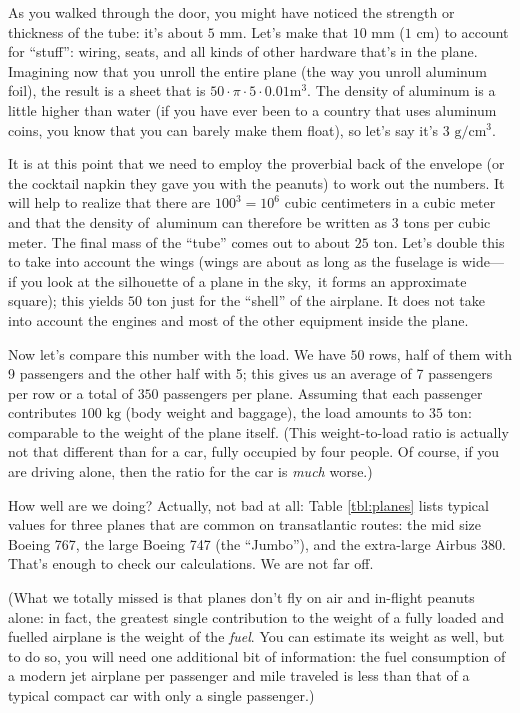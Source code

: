 As you walked through the door, you might have noticed the strength or
thickness of the tube: it's about $5 \text{ mm}$. Let's make that $10
\text{ mm}$ ($1 \text{ cm}$) to account for ``stuff'': wiring, seats,
and all kinds of other hardware that's in the plane. Imagining now
that you unroll the entire plane (the way you unroll\vadjust{\pagebreak} aluminum foil),
the result is a sheet that is $50 \cdot \pi \cdot 5 \cdot 0.0 1
\text{m}^3$. The density of aluminum is a little higher than water (if you
have ever been to a country that uses aluminum coins, you know that you can barely make them float), so let's say it's $3 \text{ g}/\text{cm}^3$.

It is at this point that we need to employ the proverbial back of the
envelope  (or the cocktail napkin they gave you with the peanuts) to
work out the numbers. It will help to realize that there are $100^3 =
10^6$ cubic centimeters in a cubic meter and that the density 
of~aluminum can therefore be written as $3$ tons per cubic meter. The
final mass of the ``tube'' comes out to about $25$ ton. Let's double
this to take into account the wings (wings are about as long as the
fuselage is wide---if you look at the silhouette of a plane in the
sky,~it forms an approximate square); this yields $50$ ton just for
the ``shell'' of the airplane. It does not take into account the
engines and most of the other equipment inside the plane.

Now let's compare this number with the load. We have $50$ rows, half
of them with 9 passengers and the other half with 5; this gives
us an average of 7 passengers per row or a total of $350$
passengers per plane. Assuming that each passenger contributes $100
\text{ kg}$ (body weight and baggage), the load amounts to $35$ ton:
comparable to the weight of the plane itself. (This weight-to-load
ratio is actually not that different than for a car, fully occupied by
four people. Of course, if you are driving alone, then the ratio for
the car is \emph{much} worse.)

How well are we doing? Actually, not bad at all: Table
\ref{tbl:planes} lists typical values for three planes that are common
on transatlantic routes: the mid size Boeing 767, the large Boeing 747
(the ``Jumbo''), and the extra-large Airbus 380. That's enough to
check our calculations. We are not far off.

(What we totally missed is that planes don't fly on air and in-flight
peanuts alone: in fact, the greatest single contribution to the weight
of a fully loaded and fuelled airplane is the weight of the
\emph{fuel}. You can estimate its weight as well, but to do so, you
will need one additional bit of information: the fuel consumption of a
modern jet airplane per passenger and mile traveled is less than that
of a typical compact car with only a single passenger.)

